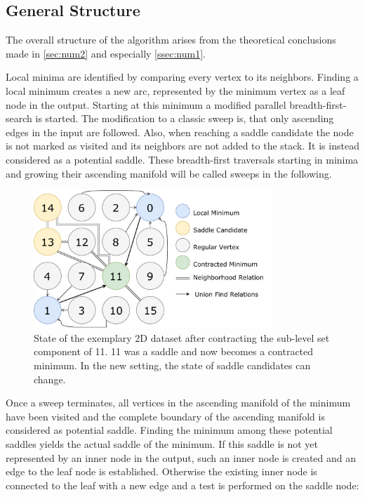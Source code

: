 \documentclass{scrartcl}
\begin{document}
\subsection{General Structure}
The overall structure of the algorithm arises from the theoretical conclusions made in \ref{sec:num2} and especially \ref{ssec:num1}. 

Local minima are identified by comparing every vertex to its neighbors. Finding a local minimum creates a new arc, represented by the minimum vertex as a leaf node in the output. Starting at this minimum a modified parallel breadth-first-search is started. The modification to a classic sweep is, that only ascending edges in the input are followed. Also, when reaching a saddle candidate the node is not marked as visited and its neighbors are not added to the stack. It is instead considered as a potential saddle. These breadth-first traversals starting in minima and growing their ascending manifold will be called sweeps in the following.

\begin{figure}[h!]
\centering
\includegraphics[width=0.8\textwidth]{figures/ContractedSaddle.pdf}
\caption{State of the exemplary 2D dataset after contracting the sub-level set component of 11. 11 was a saddle and now becomes a contracted minimum. In the new setting, the state of saddle candidates can change.}
\label{fig:cons}
\end{figure}

Once a sweep terminates, all vertices in the ascending manifold of the minimum have been visited and the complete boundary of the ascending manifold is considered as potential saddle. Finding the minimum among these potential saddles yields the actual saddle of the minimum. If this saddle is not yet represented by an inner node in the output, such an inner node is created and an edge to the leaf node is established. Otherwise the existing inner node is connected to the leaf with a new edge and a test is performed on the saddle node: 
\end{document}
